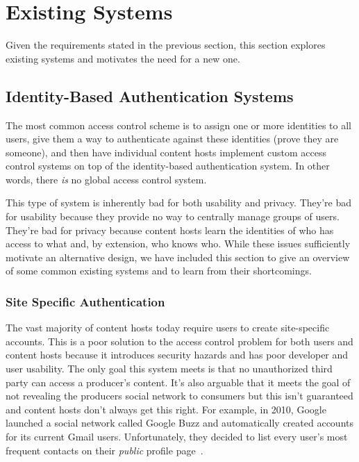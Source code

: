 \documentclass[pdftex,12pt,a4papaer,twoside,notitlepage]{report}
\begin{document}
\section{Existing Systems} 

Given the requirements stated in the previous section, this section explores existing
systems and motivates the need for a new one.

\subsection{Identity-Based Authentication Systems}
\label{sec:identity-auth}

The most common access control scheme is to assign one or more identities to all
users, give them a way to authenticate against these identities (prove they are
someone), and then have individual content hosts implement custom access control
systems on top of the identity-based authentication system. In other words,
there \emph{is} no global access control system.

This type of system is inherently bad for both usability and privacy. They're
bad for usability because they provide no way to centrally manage groups of
users. They're bad for privacy because content hosts learn the identities of who
has access to what and, by extension, who knows who. While these issues
sufficiently motivate an alternative design, we have included this section to
give an overview of some common existing systems and to learn from their
shortcomings.

\subsubsection{Site Specific Authentication}

The vast majority of content hosts today require users to create site-specific
accounts. This is a poor solution to the access control problem for both users
and content hosts because it introduces security hazards and has poor developer
and user usability. The only goal this system meets is that no unauthorized
third party can access a producer's content. It's also arguable that it meets
the goal of not revealing the producers social network to consumers but this
isn't guaranteed and content hosts don't always get this right. For example, in
2010, Google launched a social network called Google Buzz and automatically
created accounts for its current Gmail users. Unfortunately, they decided to
list every user's most frequent contacts on their \emph{public} profile
page~\cite{google-buzz}.
\end{document}
